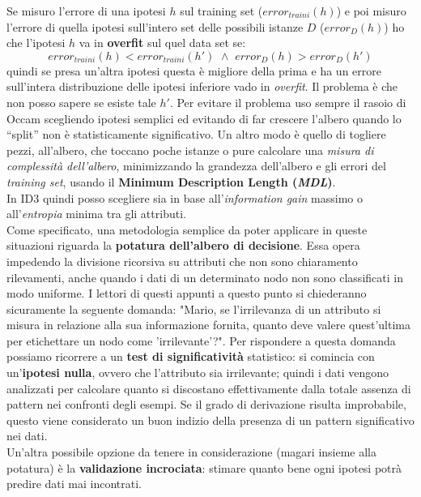 Se misuro l'errore di una ipotesi
$h$ sul training set ($error_{traini}(h)$) e poi misuro l'errore di quella
ipotesi sull'intero set delle possibili istanze
$D$ ($error_D(h)$) ho che l'ipotesi $h$ va in \textbf{overfit} sul quel data set
se:
\[error_{traini}(h) < error_{traini}(h') \,\,\land
  \,\,error_D(h)>error_D(h')\]
quindi se presa un'altra ipotesi questa è migliore della prima e ha un errore
sull'intera distribuzione delle ipotesi inferiore vado in \textit{overfit}. Il
problema è che non posso sapere se esiste tale $h'$. Per evitare il problema uso
sempre il rasoio di Occam scegliendo ipotesi semplici ed evitando di far
crescere l'albero quando lo ``split'' non è statisticamente significativo. Un
altro modo è quello di togliere pezzi, all'albero, che toccano poche istanze o
pure calcolare una \textit{misura di complessità dell'albero}, minimizzando la
grandezza dell'albero e gli errori del \textit{training set}, usando il
\textbf{Minimum Description Length (\textit{MDL})}.\\
In ID3 quindi posso scegliere sia in base all'\textit{information gain} massimo
o all'\textit{entropia} minima tra gli attributi.\\
Come specificato, una metodologia semplice da poter applicare in queste situazioni riguarda la \textbf{potatura dell'albero di decisione}. Essa opera impedendo la divisione ricorsiva su attributi che non sono chiaramento rilevamenti, anche quando i dati di un determinato nodo non sono classificati in modo uniforme. I lettori di questi appunti a questo punto si chiederanno sicuramente la seguente domanda: "Mario, se l'irrilevanza di un attributo si misura in relazione alla sua informazione fornita, quanto deve valere quest'ultima per etichettare un nodo come 'irrilevante'?". Per rispondere a questa domanda possiamo ricorrere a un \textbf{test di significatività} statistico: si comincia con un'\textbf{ipotesi nulla}, ovvero che l'attributo sia irrilevante; quindi i dati vengono analizzati per calcolare quanto si discostano effettivamente dalla totale assenza di pattern nei confronti degli esempi. Se il grado di derivazione risulta improbabile, questo viene considerato un buon indizio della presenza di un pattern significativo nei dati. \\ Un'altra possibile opzione da tenere in considerazione (magari insieme alla potatura) è la \textbf{validazione incrociata}: stimare quanto bene ogni ipotesi potrà predire dati mai incontrati.
